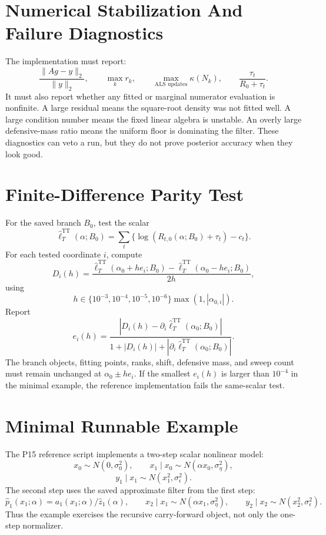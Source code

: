 \documentclass[11pt]{article}
\newcommand{\TT}{\mathrm{TT}}
\theoremstyle{definition}
\theoremstyle{remark}
\renewcommand{\[}{\begin{equation}}
\renewcommand{\]}{\end{equation}}
\begin{document}
\section{Numerical Stabilization And Failure Diagnostics}

The implementation must report:
\[
  \frac{\|A g-y\|_2}{\|y\|_2},\qquad
  \max_k r_k,\qquad
  \max_{\text{ALS updates}}\kappa(N_k),
  \qquad
  \frac{\tau_t}{R_0+\tau_t}.
  \label{eq:p15-diagnostics}
\]
It must also report whether any fitted or marginal numerator evaluation is
nonfinite.  A large residual means the square-root density was not fitted
well.  A large condition number means the fixed linear algebra is unstable.
An overly large defensive-mass ratio means the uniform floor is dominating the
filter.  These diagnostics can veto a run, but they do not prove posterior
accuracy when they look good.

\section{Finite-Difference Parity Test}

For the saved branch \(B_0\), test the scalar
\[
  \widehat\ell_T^{\TT}(\alpha;B_0)
  =
  \sum_t\{\log(R_{t,0}(\alpha;B_0)+\tau_t)-c_t\}.
  \label{eq:p15-parity-scalar}
\]
For each tested coordinate \(i\), compute
\[
  D_i(h)=
  \frac{
  \widehat\ell_T^{\TT}(\alpha_0+h e_i;B_0)
  -
  \widehat\ell_T^{\TT}(\alpha_0-h e_i;B_0)}
  {2h},
  \label{eq:p15-centered-difference}
\]
using
\[
  h\in\{10^{-3},10^{-4},10^{-5},10^{-6}\}\max(1,|\alpha_{0,i}|).
  \label{eq:p15-h-ladder}
\]
Report
\[
  e_i(h)=
  \frac{|D_i(h)-\partial_i\widehat\ell_T^{\TT}(\alpha_0;B_0)|}
       {1+|D_i(h)|+|\partial_i\widehat\ell_T^{\TT}(\alpha_0;B_0)|}.
  \label{eq:p15-parity-error}
\]
The branch objects, fitting points, ranks, shift, defensive mass, and sweep
count must remain unchanged at \(\alpha_0\pm h e_i\).  If the smallest
\(e_i(h)\) is larger than \(10^{-4}\) in the minimal example, the reference
implementation fails the same-scalar test.

\section{Minimal Runnable Example}

The P15 reference script implements a two-step scalar nonlinear model:
\[
  x_0\sim N(0,\sigma_0^2),\qquad
  x_1\mid x_0\sim N(\alpha x_0,\sigma_\eta^2),
  \label{eq:p15-toy-transition}
\]
\[
  y_1\mid x_1\sim N(x_1^2,\sigma_\epsilon^2).
  \label{eq:p15-toy-observation}
\]
The second step uses the saved approximate filter from the first step:
\[
  \widehat p_1(x_1;\alpha)=a_1(x_1;\alpha)/\widehat z_1(\alpha),
  \qquad
  x_2\mid x_1\sim N(\alpha x_1,\sigma_\eta^2),
  \qquad
  y_2\mid x_2\sim N(x_2^2,\sigma_\epsilon^2).
  \label{eq:p15-toy-step2}
\]
Thus the example exercises the recursive carry-forward object, not only the
one-step normalizer.
\end{document}
